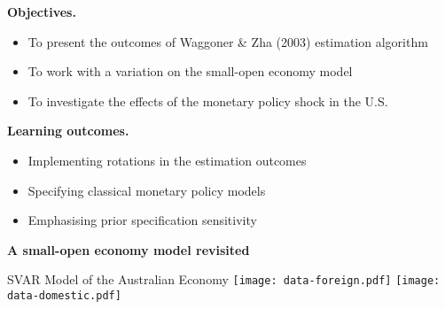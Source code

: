 \documentclass[notes,blackandwhite,mathsans,usenames,dvipsnames]{beamer}
\begin{document}
{
\begin{frame}

\bigskip\textbf{\color{mcxs1}Objectives.}
\begin{itemize}[label=$\blacktriangleright$]
\item {\color{mcxs1}To present the outcomes of Waggoner \& Zha (2003) estimation algorithm}
\item {\color{mcxs1}To work with a variation on the small-open economy model}
\item {\color{mcxs1}To investigate the effects of the monetary policy shock in the U.S.}
\end{itemize}

\bigskip\textbf{\color{purple}Learning outcomes.}
\begin{itemize}[label=$\blacktriangleright$]
\item {\color{purple}Implementing rotations in the estimation outcomes}
\item {\color{purple}Specifying classical monetary policy models}
\item {\color{purple}Emphasising prior specification sensitivity}
\end{itemize}

\end{frame}
}




{
\begin{frame}

\begin{adjustwidth}{-0.5cm}{0cm}
\vspace{8.3cm}\Large
\textbf{{\color{purple}A small-open economy model} {\color{mcxs2}revisited}}
\end{adjustwidth}

\end{frame}
}




\begin{frame}{SVAR Model of the Australian Economy}
\centering
\texttt{[image: data-foreign.pdf]}
\texttt{[image: data-domestic.pdf]}

\end{frame}
\end{document}
